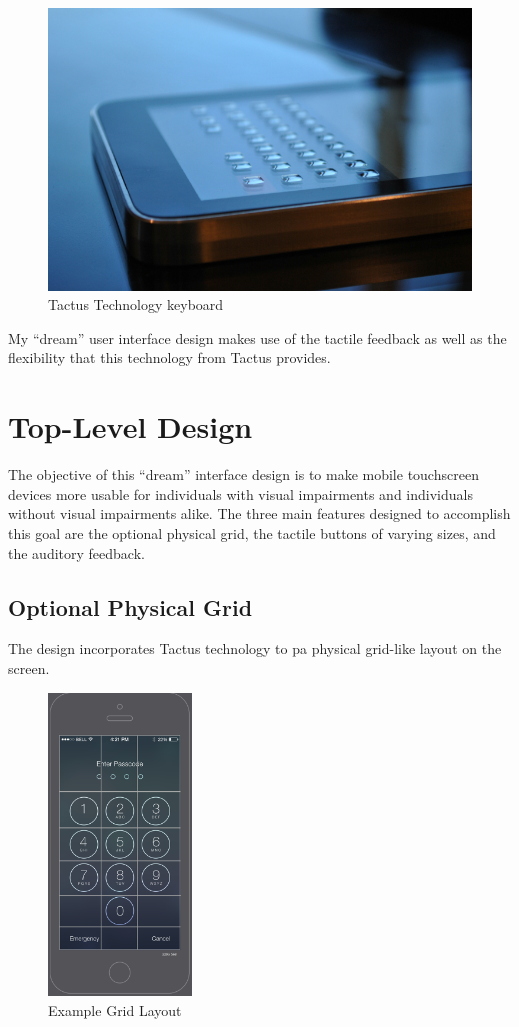 \documentclass[11pt]{article}
\begin{document}
\begin{figure}[ht]
\centering
\includegraphics[width=4.5in]{tactus2.jpg} 
\caption{Tactus Technology keyboard}
\label{tactus1}
\end{figure}

My ``dream'' user interface design makes use of the tactile feedback as well as the flexibility that this technology from Tactus provides.


\section{Top-Level Design}
The objective of this ``dream'' interface design is to make mobile touchscreen devices more usable for individuals with visual impairments and individuals without visual impairments alike. The three main features designed to accomplish this goal are the optional physical grid, the tactile buttons of varying sizes, and the auditory feedback. 


\subsection{Optional Physical Grid}
The design incorporates Tactus technology to pa physical grid-like layout on the screen.


\begin{figure}[ht]
\centering
\includegraphics[width=1.5in]{wireframe-grid.png} 
\caption{Example Grid Layout}
\label{wireframe-grid}
\end{figure}
\end{document}
